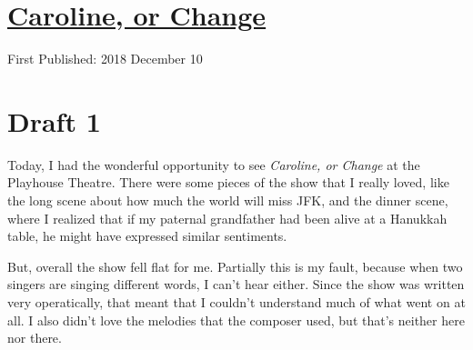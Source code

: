 \documentclass[12pt]{article}[titlepage]
\newcommand{\1}{\={a}}
\newcommand{\2}{\={e}}
\newcommand{\3}{\={\i}}
\newcommand{\4}{\=o}
\newcommand{\5}{\=u}
\newcommand{\6}{\={A}}
\renewcommand{\,}{\textsuperscript{,}}
\begin{document}
\doublespacing
\section{\href{caroline.html}{Caroline, or Change}}
First Published: 2018 December 10
\section{Draft 1}
Today, I had the wonderful opportunity to see \textit{Caroline, or Change} at the Playhouse Theatre.
There were some pieces of the show that I really loved, like the long scene about how much the world will miss JFK, and the dinner scene, where I realized that if my paternal grandfather had been alive at a Hanukkah table, he might have expressed similar sentiments.

But, overall the show fell flat for me.
Partially this is my fault, because when two singers are singing different words, I can't hear either.
Since the show was written very operatically, that meant that I couldn't understand much of what went on at all.
I also didn't love the melodies that the composer used, but that's neither here nor there.
\end{document}
